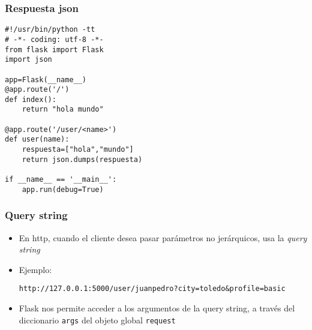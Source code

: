 \documentclass[ucs]{beamer}
\begin{document}
\begin{frame}[fragile]
\frametitle{Respuesta json}

  \begin{footnotesize}
  \begin{verbatim}
#!/usr/bin/python -tt
# -*- coding: utf-8 -*-
from flask import Flask 
import json

app=Flask(__name__)
@app.route('/')
def index():
    return "hola mundo"

@app.route('/user/<name>') 
def user(name):
    respuesta=["hola","mundo"]
    return json.dumps(respuesta)

if __name__ == '__main__': 
    app.run(debug=True)
  \end{verbatim}
  \end{footnotesize}
\end{frame}


\begin{frame}[fragile]
\frametitle{Query string}
\begin{itemize}
\item
En http, cuando el cliente desea pasar parámetros no jerárquicos,
usa la \emph{query string}

\item
Ejemplo:
  \begin{footnotesize}
  \begin{verbatim}
http://127.0.0.1:5000/user/juanpedro?city=toledo&profile=basic
  \end{verbatim}
  \end{footnotesize}
\item
Flask nos permite acceder a los argumentos de la query string,
a través del diccionario \verb|args| del objeto global
\verb|request| 
\end{itemize}

\end{frame}
\end{document}
